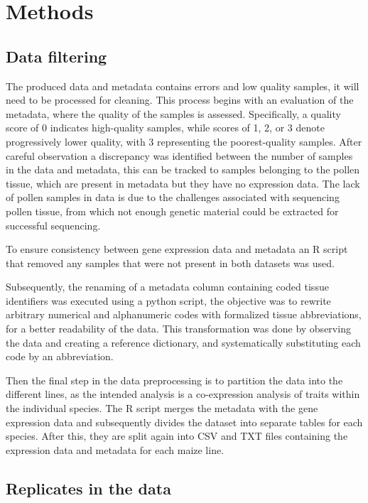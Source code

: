 \documentclass[
]{article}
\begin{document}
\hypertarget{methods}{%
\section{Methods}\label{methods}}

\hypertarget{data-filtering}{%
\subsection{Data filtering}\label{data-filtering}}

The produced data and metadata contains errors and low quality samples,
it will need to be processed for cleaning. This process begins with an
evaluation of the metadata, where the quality of the samples is
assessed. Specifically, a quality score of 0 indicates high-quality
samples, while scores of 1, 2, or 3 denote progressively lower quality,
with 3 representing the poorest-quality samples. After careful
observation a discrepancy was identified between the number of samples
in the data and metadata, this can be tracked to samples belonging to
the pollen tissue, which are present in metadata but they have no
expression data. The lack of pollen samples in data is due to the
challenges associated with sequencing pollen tissue, from which not
enough genetic material could be extracted for successful sequencing.

To ensure consistency between gene expression data and metadata an R
script that removed any samples that were not present in both datasets
was used.

Subsequently, the renaming of a metadata column containing coded tissue
identifiers was executed using a python script, the objective was to
rewrite arbitrary numerical and alphanumeric codes with formalized
tissue abbreviations, for a better readability of the data. This
transformation was done by observing the data and creating a reference
dictionary, and systematically substituting each code by an
abbreviation.

Then the final step in the data preprocessing is to partition the data
into the different lines, as the intended analysis is a co-expression
analysis of traits within the individual species. The R script merges
the metadata with the gene expression data and subsequently divides the
dataset into separate tables for each species. After this, they are
split again into CSV and TXT files containing the expression data and
metadata for each maize line.

\hypertarget{replicates-in-the-data}{%
\subsection{Replicates in the data}\label{replicates-in-the-data}}
\end{document}
